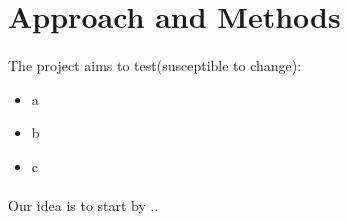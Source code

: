 \section{Approach and Methods}
\paragraph{}
The project aims to test(susceptible to change):
\begin{itemize}
    \item a
    \item b
    \item c
\end{itemize}

\paragraph{}
Our idea is to start by ..